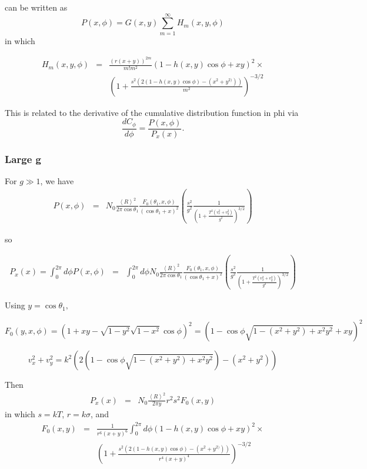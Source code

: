 \documentclass[11pt,openany]{report}
\newcommand{\der}[2]{\frac{d {#1}}{d {#2}}}
\begin{document}
{{can be written as
$$P(x,\phi)=G(x,y)\sum_{m=1}^{\infty}H_{m}(x,y,\phi)$$
in which


\begin{eqnarray} H_{m}(x,y,\phi)&=&\frac{(r(x+y))^{2m}}{m!m^{2}}\left(1-h(x,y)\cos\phi +xy\right)^{2}\times\\
&&\left(1+\frac{s^{2}\left(2(1-h(x,y)\cos\phi )-(x^{2}+y^{2)})\right)}{m^{2}}\right)^{-3/2}
\end{eqnarray}

This is related to the derivative of the cumulative distribution function in phi via
$$\der{C_{\phi}}{\phi}=\frac{P(x,\phi)}{P_{x}(x)}.$$

\subsubsection{Large g}

For $g\gg 1$, we have
\begin{eqnarray}
P(x,\phi)&=&N_{0}\frac{\left<R\right>^{2}}{2\pi\cos\theta_{1}}\frac{F_{0}(\theta_{1},x,\phi)}{(\cos{\theta_{1}}+x)^{2}}
\left(\frac{s^{2}}{g^{2}}\frac{1}{\left(1+\frac{T^{2}(v_{x}^{2}+v_{y}^{2})}{g^{2}}\right)^{3/2}}\right)\end{eqnarray}

so

\begin{eqnarray}
P_{x}(x)=\int_{0}^{2\pi}d\phi P(x,\phi)&=&
\int_{0}^{2\pi}d\phi N_{0}\frac{\left<R\right>^{2}}{2\pi\cos\theta_{1}}\frac{F_{0}(\theta_{1},x,\phi)}{(\cos{\theta_{1}}+x)^{2}}
\left(\frac{s^{2}}{g^{2}}\frac{1}{\left(1+\frac{T^{2}(v_{x}^{2}+v_{y}^{2})}{g^{2}}\right)^{3/2}}\right)\end{eqnarray}

Using $y=\cos\theta_{1},$

$$F_{0}(y,x,\phi)=\left(1+xy-\sqrt{1-y^{2}}\sqrt{1-x^{2}}\cos\phi\right)^{2}=\left(1-\cos\phi\sqrt{1-(x^{2}+y^{2})+x^{2}y^{2}}+xy\right)^{2}$$


$$v_{x}^{2}+v_{y}^{2}=k^{2}\left(2\left(1-\cos\phi\sqrt{1-(x^{2}+y^{2})+x^{2}y^{2}}\right)-(x^{2}+y^{2})\right)$$

Then
\begin{eqnarray}
P_{x}(x)&=&N_{0}\frac{\left<R\right>^{2}}{2\pi y}
r^{2}s^{2}
F_{0}(x,y)
\end{eqnarray}
in which $s=kT$, $r=k\sigma$, and 
\begin{eqnarray} F_{0}(x,y)&=&\frac{1}{r^{6}(x+y)^{6}}\int_{0}^{2\pi}d\phi\left(1-h(x,y)\cos\phi +xy\right)^{2}\times\\
&&\left(1+\frac{s^{2}\left(2(1-h(x,y)\cos\phi) -(x^{2}+y^{2)})\right)}{r^{4}(x+y)^{4}}\right)^{-3/2}
\end{eqnarray}

}}
\end{document}
